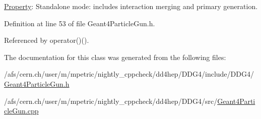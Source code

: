 \hyperlink{class_d_d4hep_1_1_property}{Property}: Standalone mode: includes interaction merging and primary generation. 

Definition at line 53 of file Geant4ParticleGun.h.

Referenced by operator()().

The documentation for this class was generated from the following files:\begin{DoxyCompactItemize}
\item 
/afs/cern.ch/user/m/mpetric/nightly\_\-cppcheck/dd4hep/DDG4/include/DDG4/\hyperlink{_geant4_particle_gun_8h}{Geant4ParticleGun.h}\item 
/afs/cern.ch/user/m/mpetric/nightly\_\-cppcheck/dd4hep/DDG4/src/\hyperlink{_geant4_particle_gun_8cpp}{Geant4ParticleGun.cpp}\end{DoxyCompactItemize}
